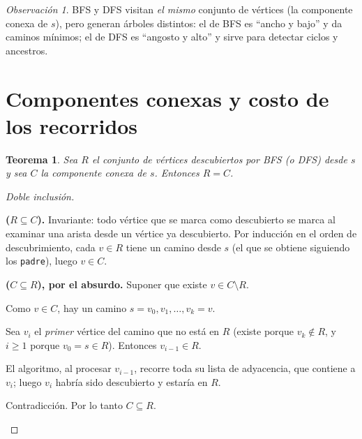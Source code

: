 \documentclass[11pt,a4paper]{article}
\theoremstyle{plain}
\newtheorem{teorema}{Teorema}[section]
\theoremstyle{definition}
\theoremstyle{remark}
\newtheorem*{observacion}{Observación}
\begin{document}
\begin{observacion}
BFS y DFS visitan \emph{el mismo} conjunto de vértices (la componente conexa de $s$),
pero generan árboles distintos: el de BFS es ``ancho y bajo'' y da caminos mínimos; el
de DFS es ``angosto y alto'' y sirve para detectar ciclos y ancestros.
\end{observacion}

\section{Componentes conexas y costo de los recorridos}

\begin{teorema}\label{t:componente}
Sea $R$ el conjunto de vértices descubiertos por BFS (o DFS) desde $s$ y sea $C$ la
componente conexa de $s$. Entonces $R=C$.
\end{teorema}
\begin{proof}[Doble inclusión]
\begin{pasos}
\item \textbf{($R\subseteq C$).} Invariante: todo vértice que se marca como descubierto
se marca al examinar una arista desde un vértice ya descubierto. Por inducción en el
orden de descubrimiento, cada $v\in R$ tiene un camino desde $s$ (el que se obtiene
siguiendo los \texttt{padre}), luego $v\in C$.
\item \textbf{($C\subseteq R$), por el absurdo.} Suponer que existe $v\in C\setminus R$.
\item Como $v\in C$, hay un camino $s=v_0,v_1,\dots,v_k=v$.
\item Sea $v_i$ el \emph{primer} vértice del camino que no está en $R$ (existe porque
$v_k\notin R$, y $i\ge 1$ porque $v_0=s\in R$). Entonces $v_{i-1}\in R$.
\item El algoritmo, al procesar $v_{i-1}$, recorre toda su lista de adyacencia, que
contiene a $v_i$; luego $v_i$ habría sido descubierto y estaría en $R$.
\item Contradicción. Por lo tanto $C\subseteq R$. \qedhere
\end{pasos}
\end{proof}
\end{document}
